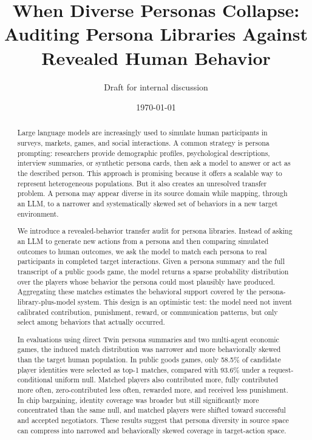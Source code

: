 \documentclass[11pt]{article}
\title{When Diverse Personas Collapse: Auditing Persona Libraries Against Revealed Human Behavior}
\author{Draft for internal discussion}
\date{\today}
\begin{document}
\maketitle

\begin{abstract}
Large language models are increasingly used to simulate human participants in surveys, markets, games, and social interactions. A common strategy is persona prompting: researchers provide demographic profiles, psychological descriptions, interview summaries, or synthetic persona cards, then ask a model to answer or act as the described person. This approach is promising because it offers a scalable way to represent heterogeneous populations. But it also creates an unresolved transfer problem. A persona may appear diverse in its source domain while mapping, through an LLM, to a narrower and systematically skewed set of behaviors in a new target environment.

We introduce a revealed-behavior transfer audit for persona libraries. Instead of asking an LLM to generate new actions from a persona and then comparing simulated outcomes to human outcomes, we ask the model to match each persona to real participants in completed target interactions. Given a persona summary and the full transcript of a public goods game, the model returns a sparse probability distribution over the players whose behavior the persona could most plausibly have produced. Aggregating these matches estimates the behavioral support covered by the persona-library-plus-model system. This design is an optimistic test: the model need not invent calibrated contribution, punishment, reward, or communication patterns, but only select among behaviors that actually occurred.

In evaluations using direct Twin persona summaries and two multi-agent economic games, the induced match distribution was narrower and more behaviorally skewed than the target human population. In public goods games, only 58.5\% of candidate player identities were selected as top-1 matches, compared with 93.6\% under a request-conditional uniform null. Matched players also contributed more, fully contributed more often, zero-contributed less often, rewarded more, and received less punishment. In chip bargaining, identity coverage was broader but still significantly more concentrated than the same null, and matched players were shifted toward successful and accepted negotiators. These results suggest that persona diversity in source space can compress into narrowed and behaviorally skewed coverage in target-action space.
\end{abstract}
\end{document}
